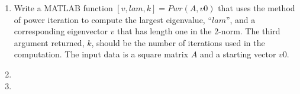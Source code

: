 \documentclass[11pt]{article}
\begin{document}
\begin{enumerate}
\begin{enumerate}
                \begin{align*}
                    AV &=
                    \begin{bmatrix}
                        0 & -2/\sqrt{2} & 0 \\
                        -1/\sqrt{6} & 1/\sqrt{2} & 2/\sqrt{3} \\
                        1/\sqrt{6} & 1/\sqrt{2} & -2/\sqrt{3} \\
                        2/\sqrt{6} & 0 & 2/\sqrt{3}
                    \end{bmatrix} \\
                    \v{u}_1 &= 
                    \begin{bmatrix}
                        0 \\
                        -1/\sqrt{6} \\
                        1/\sqrt{6} \\
                        2/\sqrt{6}
                    \end{bmatrix} \\
                    \v{u}_2 &= A\v{v}_2
                    - \v{u}_1^T A\v{v}_2 \v{u}_1 \\
                    \v{u}_2 &=
                    \begin{bmatrix}
                        0
                    \end{bmatrix}
                \end{align*}
                
                

            \item[(c)]
                Find the $1$-, $2$-, $\infty$-, and Frobenius norms of $A$.
        \end{enumerate}

    \item %
        Write a MATLAB function $[v, lam, k] = Pwr(A, v0)$ that uses the method
        of power iteration to compute the largest eigenvalue, ``$lam$'', and a
        corresponding eigenvector $v$ that has length one in the 2-norm.
        The third argument returned, $k$, should be the number of iterations used in
        the computation.
        The input data is a square matrix $A$ and a starting vector $v0$.

    \item %

    \item %

\end{enumerate}
\end{document}
